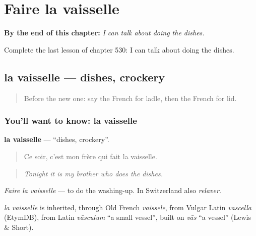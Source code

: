 
\chapter{Faire la vaisselle}
\label{ch:fr-faire-la-vaisselle}

\begin{chapteropening}
\textbf{By the end of this chapter:} \emph{I can talk about doing the dishes.}

Complete the last lesson of chapter 530: I can talk about doing the dishes.
\end{chapteropening}

\section[la vaisselle]{la vaisselle — dishes, crockery}

\label{lesson:FR-C530-vaisselle}



\begin{quote}
Before the new one: say the French for ladle, then the French for lid.
\end{quote}

\subsection*{You'll want to know: la vaisselle}
\textbf{la vaisselle} — \textquotedblleft{}dishes, crockery\textquotedblright{}.

\begin{quote}
Ce soir, c'est mon frère qui fait la vaisselle.
\end{quote}

\begin{quote}
\emph{Tonight it is my brother who does the dishes.}
\end{quote}

\emph{Faire la vaisselle} — to do the washing-up. In Switzerland also \emph{relaver}.

\begin{cousinweb}
\emph{la vaisselle} is inherited, through Old French \emph{vaissele}, from Vulgar Latin \emph{vascella} (EtymDB), from Latin \emph{vāsculum} \textquotedblleft{}a small vessel\textquotedblright{}, built on \emph{vās} \textquotedblleft{}a vessel\textquotedblright{} (Lewis \& Short).
\end{cousinweb}

